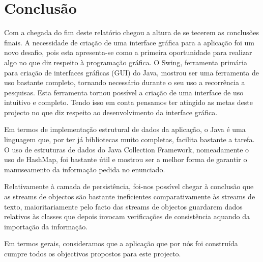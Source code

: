 \documentclass[a5paper,twocolumn, 11pt]{article}
\begin{document}
\newpage
\twocolumn

\clearpage
\section{Conclusão}
Com a chegada do fim deste relatório chegou a altura de se tecerem as conclusões finais. A necessidade de criação de uma interface gráfica para a aplicação foi um novo desafio, pois esta apresenta-se como a primeira oportunidade para realizar algo no que diz respeito à programação gráfica. O Swing, ferramenta primária para criação de interfaces gráficas (GUI) do Java, mostrou ser uma ferramenta de uso bastante completo, tornando necessário durante o seu uso a recorrência a pesquisas. Esta ferramenta tornou possível a criação de uma interface de uso intuitivo e completo. Tendo isso em conta pensamos ter atingido as metas deste projecto no que diz respeito ao desenvolvimento da interface gráfica.

Em termos de implementação estrutural de dados da aplicação, o Java é uma linguagem que, por ter já bibliotecas muito completas, facilita bastante a tarefa. O uso de estruturas de dados do Java Collection Framework, nomeadamente o uso de HashMap, foi bastante útil e mostrou ser a melhor forma de garantir o manuseamento da informação pedida no enunciado.

Relativamente à camada de persistência, foi-nos possível chegar à conclusão que as streams de objectos são bastante ineficientes comparativamente às streams de texto, maioritariamente pelo facto das streams de objectos guardarem dados relativos às classes que depois invocam verificações de consistência aquando da importação da informação.

Em termos gerais, consideramos que a aplicação que por nós foi construída cumpre todos os objectivos propostos para este projecto.


\clearpage
\onecolumn
\end{document}
